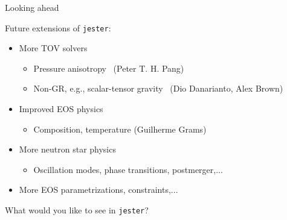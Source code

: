 \documentclass[usenames,dvipsnames,t]{beamer}
\begin{document}
\begin{frame}{Looking ahead}
  \def\x{3mm}
  \def\y{1mm}

  Future extensions of \texttt{jester}:
  \begin{itemize}
    \vspace{\y}
    \item More TOV solvers
    \begin{itemize}
      \item Pressure anisotropy~\cite{Pang:2025fes} \small (Peter T. H. Pang) \normalsize
      \item Non-GR, e.g., scalar-tensor gravity~\cite{Brown:2024joy, Creci:2024wfu} \small (Dio Danarianto, Alex Brown) \normalsize
    \end{itemize}

    \vspace{\y}
    
    \item Improved EOS physics
    \begin{itemize}
      \item Composition, temperature (Guilherme Grams)
    \end{itemize}

    \vspace{\y}
    
    \item More neutron star physics
    \begin{itemize}
      \item Oscillation modes, phase transitions, postmerger,...
    \end{itemize}
    
    \vspace{\y}
    
    \item More EOS parametrizations, constraints,...
  \end{itemize}

  \vspace{\x}

  \begin{tcolorbox}[colback=blue!5!white,colframe=blue!75!black,title=Input welcome!]
      What would you like to see in \texttt{jester}?
  \end{tcolorbox}

\end{frame}

\end{document}
